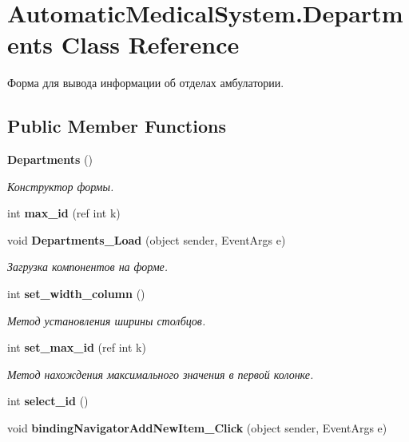 \section{AutomaticMedicalSystem.Departments Class Reference}
\label{class_automatic_medical_system_1_1_departments}
Форма для вывода информации об отделах амбулатории.  


\subsection*{Public Member Functions}
\begin{CompactItemize}
\item 
{\bf Departments} ()
\begin{CompactList}\small\item\em Конструктор формы. \item\end{CompactList}\item 
int \textbf{max\_\-id} (ref int k)\label{class_automatic_medical_system_1_1_departments_96bb73f345a34961ed32817ab1f373c5}

\item 
void {\bf Departments\_\-Load} (object sender, EventArgs e)
\begin{CompactList}\small\item\em Загрузка компонентов на форме. \item\end{CompactList}\item 
int {\bf set\_\-width\_\-column} ()
\begin{CompactList}\small\item\em Метод установления ширины столбцов. \item\end{CompactList}\item 
int {\bf set\_\-max\_\-id} (ref int k)
\begin{CompactList}\small\item\em Метод нахождения максимального значения в первой колонке. \item\end{CompactList}\item 
int \textbf{select\_\-id} ()\label{class_automatic_medical_system_1_1_departments_cc74120378f96abc4a210a10169c41b2}

\item 
void \textbf{bindingNavigatorAddNewItem\_\-Click} (object sender, EventArgs e)\label{class_automatic_medical_system_1_1_departments_6cb45d17ce7801c5b5df500fd24ed3cb}

\end{CompactItemize}


